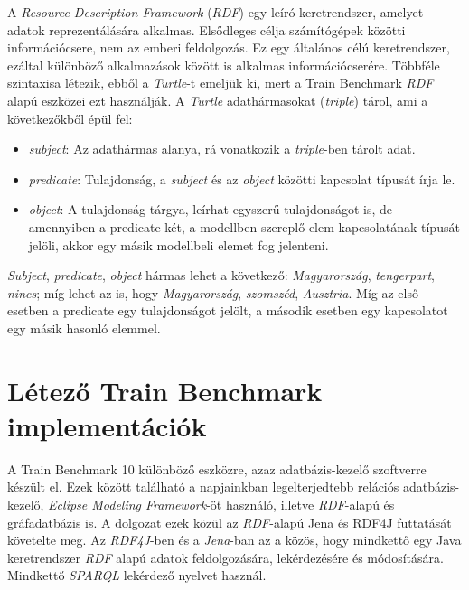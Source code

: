 A \emph{Resource Description Framework} (\emph{RDF}) egy leíró keretrendszer, amelyet adatok reprezentálására alkalmas. Elsődleges célja számítógépek közötti információcsere, nem az emberi feldolgozás. Ez egy általános célú keretrendszer, ezáltal különböző alkalmazások között is alkalmas információcserére. Többféle szintaxisa létezik, ebből a \emph{Turtle}-t emeljük ki, mert a Train Benchmark \emph{RDF} alapú eszközei ezt használják. A \emph{Turtle} adathármasokat (\emph{triple}) tárol, ami a következőkből épül fel:
\begin{itemize}
	\item \emph{subject}: Az adathármas alanya, rá vonatkozik a \emph{triple}-ben tárolt adat.
	\item \emph{predicate}: Tulajdonság, a \emph{subject} és az \emph{object} közötti kapcsolat típusát írja le.
	\item \emph{object}: A tulajdonság tárgya, leírhat egyszerű tulajdonságot is, de amennyiben a predicate két, a modellben szereplő elem kapcsolatának típusát jelöli, akkor egy másik modellbeli elemet fog jelenteni.
\end{itemize}

\emph{Subject}, \emph{predicate}, \emph{object} hármas lehet a következő: \emph{Magyarország}, \emph{tengerpart}, \emph{nincs}; míg lehet az is, hogy \emph{Magyarország}, \emph{szomszéd}, \emph{Ausztria}. Míg az első esetben a predicate egy tulajdonságot jelölt, a második esetben egy kapcsolatot egy másik hasonló elemmel.

\section{Létező Train Benchmark implementációk}

A Train Benchmark 10 különböző eszközre, azaz adatbázis-kezelő szoftverre készült el. Ezek között található a napjainkban legelterjedtebb relációs adatbázis-kezelő, \emph{Eclipse Modeling Framework}-öt használó, illetve \emph{RDF}-alapú és gráfadatbázis is. A dolgozat ezek közül az \emph{RDF}-alapú Jena és  RDF4J futtatását követelte meg.
Az \emph{RDF4J}-ben és a \emph{Jena}-ban az a közös, hogy mindkettő egy Java keretrendszer \emph{RDF} alapú adatok feldolgozására, lekérdezésére és módosítására. Mindkettő \emph{SPARQL} lekérdező nyelvet használ.